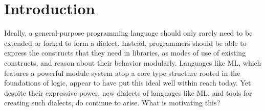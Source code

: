 \section{Introduction}\label{motivation}
Ideally, a general-purpose programming language should only rarely need to be  extended or forked to form a dialect. Instead, programmers should be able to  express the constructs that they need in  libraries, as modes of use of existing constructs, and reason about their behavior modularly. %
Languages like ML, which features a powerful module system atop a core type structure rooted in the foundations of logic, appear to have put this ideal well within reach today. 
Yet despite their expressive power, new {dialects} of languages like ML, and tools for creating such dialects, do continue to arise. What is motivating this?

